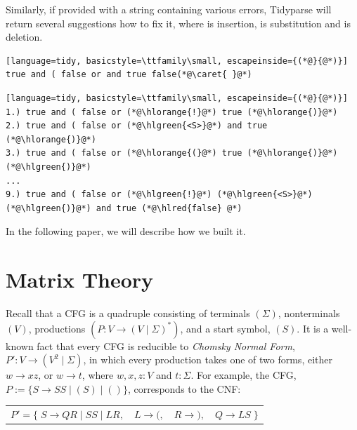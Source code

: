 \documentclass[sigplan,review,anonymous,acmsmall]{acmart}\settopmatter{printfolios=false,printccs=false,printacmref=false}
\begin{document}
\noindent Similarly, if provided with a string containing various errors, Tidyparse will return several suggestions how to fix it, where  is insertion,  is substitution and  is deletion.


\begin{tcolorbox}
\begin{lstlisting}[language=tidy, basicstyle=\ttfamily\small, escapeinside={(*@}{@*)}]
true and ( false or and true false(*@\caret{ }@*)
\end{lstlisting}
\tcblower
\begin{lstlisting}[language=tidy, basicstyle=\ttfamily\small, escapeinside={(*@}{@*)}]
1.) true and ( false or (*@\hlorange{!}@*) true (*@\hlorange{)}@*)
2.) true and ( false or (*@\hlgreen{<S>}@*) and true (*@\hlorange{)}@*)
3.) true and ( false or (*@\hlorange{(}@*) true (*@\hlorange{)}@*) (*@\hlgreen{)}@*)
...
9.) true and ( false or (*@\hlgreen{!}@*) (*@\hlgreen{<S>}@*) (*@\hlgreen{)}@*) and true (*@\hlred{false} @*)
\end{lstlisting}
\end{tcolorbox}

\noindent In the following paper, we will describe how we built it.

\section{Matrix Theory}\label{sec:matrix}

Recall that a CFG is a quadruple consisting of terminals $(\Sigma)$, nonterminals $(V)$, productions $(P\colon V \rightarrow (V \mid \Sigma)^*)$, and a start symbol, $(S)$. It is a well-known fact that every CFG is reducible to \textit{Chomsky Normal Form}, $P'\colon V \rightarrow (V^2 \mid \Sigma)$, in which every production takes one of two forms, either $w \rightarrow xz$, or $w \rightarrow t$, where $w, x, z: V$ and $t: \Sigma$. For example, the CFG, $P:=\{S \rightarrow S S \mid ( S ) \mid ()\}$, corresponds to the CNF:\vspace{-3pt}

\begin{table}[H]
\begin{tabular}{llll}
$P'=\big\{\;S\rightarrow QR \mid SS \mid LR,$ & $L \rightarrow (,$ & $R \rightarrow ),$ & $Q\rightarrow LS\;\big\}$
\end{tabular}
\end{table}\vspace{-8pt}
\end{document}
